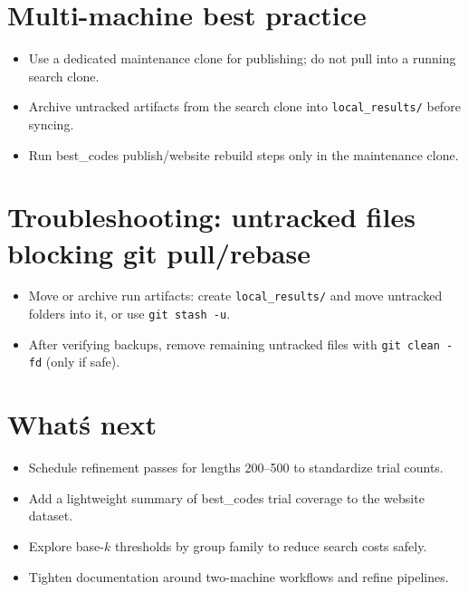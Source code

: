 \documentclass[11pt]{article}
\begin{document}
\section{Multi-machine best practice}
\begin{itemize}
  \item Use a dedicated maintenance clone for publishing; do not pull into a running
    search clone.
  \item Archive untracked artifacts from the search clone into
    \texttt{local\_results/} before syncing.
  \item Run best\_codes publish/website rebuild steps only in the maintenance clone.
\end{itemize}

\section{Troubleshooting: untracked files blocking git pull/rebase}
\begin{itemize}
  \item Move or archive run artifacts: create \texttt{local\_results/} and move
    untracked folders into it, or use \texttt{git stash -u}.
  \item After verifying backups, remove remaining untracked files with
    \texttt{git clean -fd} (only if safe).
\end{itemize}

\section{What\'s next}
\begin{itemize}
  \item Schedule refinement passes for lengths 200--500 to standardize trial counts.
  \item Add a lightweight summary of best\_codes trial coverage to the website dataset.
  \item Explore base-$k$ thresholds by group family to reduce search costs safely.
  \item Tighten documentation around two-machine workflows and refine pipelines.
\end{itemize}
\end{document}
